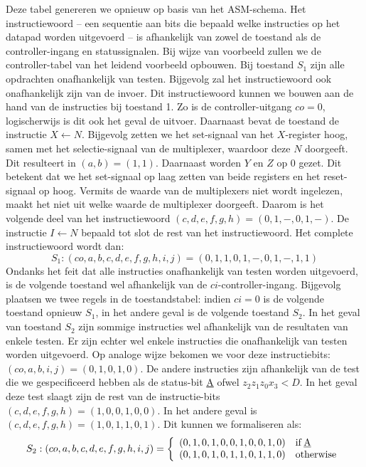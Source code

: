 Deze tabel genereren we opnieuw op basis van het ASM-schema. Het instructiewoord -- een sequentie aan bits die bepaald welke instructies op het datapad worden uitgevoerd -- is afhankelijk van zowel de toestand als de controller-ingang en statussignalen. Bij wijze van voorbeeld zullen we de controller-tabel van het leidend voorbeeld opbouwen. Bij toestand $S_1$ zijn alle opdrachten onafhankelijk van testen. Bijgevolg zal het instructiewoord ook onafhankelijk zijn van de invoer. Dit instructiewoord kunnen we bouwen aan de hand van de instructies bij toestand 1. Zo is de controller-uitgang $co=0$, logischerwijs is dit ook het geval de uitvoer. Daarnaast bevat de toestand de instructie $X\gets N$. Bijgevolg zetten we het set-signaal van het $X$-register hoog, samen met het selectie-signaal van de multiplexer, waardoor deze $N$ doorgeeft. Dit resulteert in $\left(a,b\right)=\left(1,1\right)$. Daarnaast worden $Y$ en $Z$ op $0$ gezet. Dit betekent dat we het set-signaal op laag zetten van beide registers en het
reset-signaal op hoog. Vermits de waarde van de multiplexers niet wordt ingelezen, maakt het niet uit welke waarde de multiplexer doorgeeft. Daarom is het volgende deel van het instructiewoord $\left(c,d,e,f,g,h\right)=\left(0,1,-,0,1,-\right)$. De instructie $I\gets N$ bepaald tot slot de rest van het instructiewoord. Het complete instructiewoord wordt dan:
\begin{equation}
S_1:\left(co,a,b,c,d,e,f,g,h,i,j\right)=\left(0,1,1,0,1,-,0,1,-,1,1\right)
\end{equation}
Ondanks het feit dat alle instructies onafhankelijk van testen worden uitgevoerd, is de volgende toestand wel afhankelijk van de $ci$-controller-ingang. Bijgevolg plaatsen we twee regels in de toestandstabel: indien $ci=0$ is de volgende toestand opnieuw $S_1$, in het andere geval is de volgende toestand $S_2$. In het geval van toestand $S_2$ zijn sommige instructies wel afhankelijk van de resultaten van enkele testen. Er zijn echter wel enkele instructies die onafhankelijk van testen worden uitgevoerd. Op analoge wijze bekomen we voor deze instructiebits: $\left(co,a,b,i,j\right)=\left(0,1,0,1,0\right)$. De andere instructies zijn afhankelijk van de test die we gespecificeerd hebben als de status-bit \underline{A} ofwel $z_2z_1z_0x_3<D$. In het geval deze test slaagt zijn de rest van de instructie-bits $\left(c,d,e,f,g,h\right)=\left(1,0,0,1,0,0\right)$. In het andere geval is $\left(c,d,e,f,g,h\right)=\left(1,0,1,1,0,1\right)$. Dit kunnen we formaliseren als:
\begin{equation}
S_2:\left(co,a,b,c,d,e,f,g,h,i,j\right)=\left\{\begin{array}{ll}
\left(0,1,0,1,0,0,1,0,0,1,0\right)&\operatorname{if}\mbox{\underline{A}}\\
\left(0,1,0,1,0,1,1,0,1,1,0\right)&\operatorname{otherwise}\\
\end{array}\right.
\end{equation}
